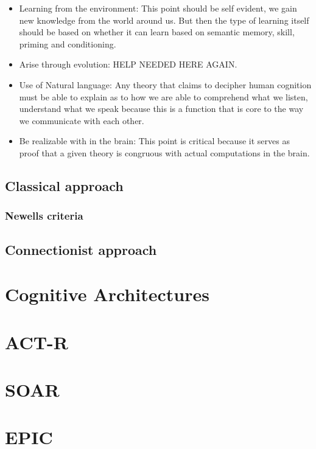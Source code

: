 \begin{itemize}
\item Learning from the environment: This point should be self
evident, we gain new knowledge from the world around us. But then
the type of learning itself should be based on whether it can learn based on
semantic memory, skill, priming and conditioning.

\item Arise through evolution: HELP NEEDED HERE AGAIN.

\item Use of Natural language: Any theory that claims to decipher human
cognition must be able to explain as to how we are able to comprehend
what we listen, understand what we speak because this is a function
that is core to the way we communicate with each other.

\item Be realizable with in the brain: This point is critical because
it serves as proof that a given theory is congruous with actual
computations in the brain.
\end{itemize}


\subsection{Classical approach}
\subsubsection{Newells criteria}
\subsection{Connectionist approach}
\section{Cognitive Architectures}
\section{ACT-R}
\section{SOAR}
\section{EPIC}
